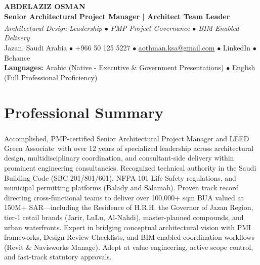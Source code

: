 \documentclass[a4paper,10pt]{article}
\begin{document}
\pagestyle{empty}

\begin{center}
    {\Huge \textbf{\color{primary} ABDELAZIZ OSMAN}} \\ \vspace{2pt}
    {\large \textbf{\color{secondary} Senior Architectural Project Manager | Architect Team Leader}} \\ \vspace{2pt}
    {\small \textit{Architectural Design Leadership $\bullet$ PMP\textsuperscript{\textregistered} Project Governance $\bullet$ BIM-Enabled Delivery}} \\ \vspace{4pt}
    {\small Jazan, Saudi Arabia $\bullet$ +966 50 125 5227 $\bullet$ \href{mailto:aothman.ksa@gmail.com}{aothman.ksa@gmail.com} $\bullet$ LinkedIn $\bullet$ Behance} \\ \vspace{2pt}
    {\small \textbf{Languages:} Arabic (Native - Executive \& Government Presentations) $\bullet$ English (Full Professional Proficiency)}
\end{center}

\vspace{-4pt}

\section{Professional Summary}
\small
Accomplished, PMP\textsuperscript{\textregistered}-certified Senior Architectural Project Manager and LEED Green Associate\texttrademark\ with over 12 years of specialized leadership across architectural design, multidisciplinary coordination, and consultant-side delivery within prominent engineering consultancies. Recognized technical authority in the Saudi Building Code (SBC 201/801/601), NFPA 101 Life Safety regulations, and municipal permitting platforms (Balady and Salamah). Proven track record directing cross-functional teams to deliver over 100,000+ sqm BUA valued at 150M+ SAR---including the Residence of H.R.H. the Governor of Jazan Region, tier-1 retail brands (Jarir, LuLu, Al-Nahdi), master-planned compounds, and urban waterfronts. Expert in bridging conceptual architectural vision with PMI frameworks, Design Review Checklists, and BIM-enabled coordination workflows (Revit \& Navisworks Manage). Adept at value engineering, active scope control, and fast-track statutory approvals.

\end{document}
